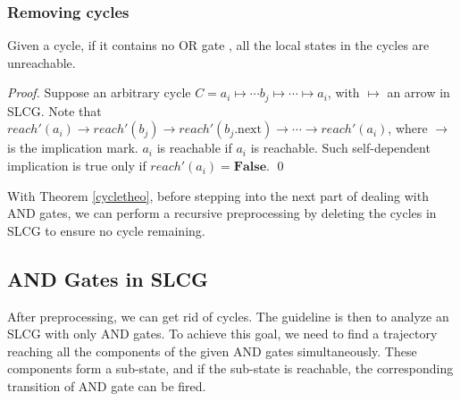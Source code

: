 \documentclass[runningheads]{llncs}
\begin{document}
\subsubsection{Removing cycles}
\begin{theorem}\label{cycletheo}
Given a cycle, if it contains no OR gate%
, all the local states in the cycles are unreachable.
\end{theorem}

\begin{proof}
Suppose an arbitrary cycle $C=a_i\mapsto \cdots b_j\mapsto\cdots \mapsto a_i$, with $\mapsto$ an arrow in SLCG. Note that $reach'(a_i)\to reach'(b_j)\to reach'(b_j.\text{next})\to\cdots\to reach'(a_i)$, where $\to$ is the implication mark. $a_i$ is reachable if $a_i$ is reachable. Such self-dependent implication is true only if $reach'(a_i)=\mathbf{False}$.
\qed
\end{proof}



With Theorem \ref{cycletheo}, before stepping into the next part of dealing with AND gates, we can perform a recursive preprocessing by deleting the cycles in SLCG to ensure no cycle remaining.

\subsection{AND Gates in SLCG}\label{sectAndGates}
After preprocessing, we can get rid of cycles.
The guideline is then to analyze an SLCG with only AND gates.
To achieve this goal, we need to find a trajectory reaching all the components of the given AND gates simultaneously.
These components form a sub-state, and if the sub-state is reachable, the corresponding transition of AND gate can be fired. 
\end{document}
